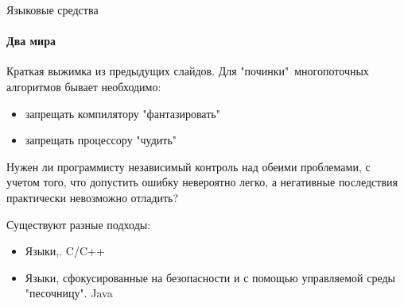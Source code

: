 \begin{frame}[t,noframenumbering]{Языковые средства}
\framesubtitle{Два мира}

Краткая выжимка из предыдущих слайдов. Для "починки"\ многопоточных алгоритмов бывает необходимо:
\begin{itemize}
  \item запрещать компилятору "фантазировать"
  \item запрещать процессору "чудить"
\end{itemize}

Нужен ли программисту независимый контроль над обеими проблемами, с учетом того, что допустить ошибку невероятно легко, а негативные последствия практически невозможно отладить?

Существуют разные подходы:
\begin{itemize}
  
  \item Языки,.
  C/C++

  \item Языки, сфокусированные на безопасности и с помощью управляемой среды "песочницу".
  Java
\end{itemize}

\end{frame}


